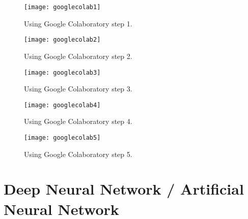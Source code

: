 	\begin{figure}[htb]
		\centering
		\texttt{[image: googlecolab1]}
		\caption[Using Google Colab step 1]{Using Google Colaboratory step 1.}
		\label{fig:googlecolab1}
	\end{figure}

	\begin{figure}[htb]
		\centering
		\texttt{[image: googlecolab2]}
		\caption[Using Google Colab step 2]{Using Google Colaboratory step 2.}
		\label{fig:googlecolab2}
	\end{figure}

	\begin{figure}[htb]
		\centering
		\texttt{[image: googlecolab3]}
		\caption[Using Google Colab step 3]{Using Google Colaboratory step 3.}
		\label{fig:googlecolab3}
	\end{figure}

 	\begin{figure}[htb]
		\centering
		\texttt{[image: googlecolab4]}
		\caption[Using Google Colab step 4]{Using Google Colaboratory step 4.}
		\label{fig:googlecolab4}
	\end{figure}
\clearpage{}

 	\begin{figure}[htb]
		\centering
		\texttt{[image: googlecolab5]}
		\caption[Using Google Colab step 5]{Using Google Colaboratory step 5.}
		\label{fig:googlecolab5}
	\end{figure}


	\section{Deep Neural Network / Artificial Neural Network}

